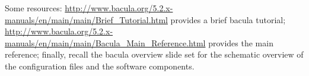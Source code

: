 \documentclass{article}   	%
\begin{document}
Some resources: \url{http://www.bacula.org/5.2.x-manuals/en/main/main/Brief_Tutorial.html} provides a brief bacula tutorial; \url{http://www.bacula.org/5.2.x-manuals/en/main/main/Bacula_Main_Reference.html} provides the main reference; finally, recall the bacula overview slide set for the schematic overview of the configuration files and the software components.
\end{document}
